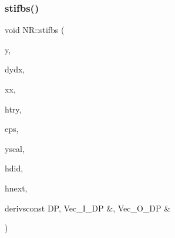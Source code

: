 \subsubsection{\texorpdfstring{stifbs()}{stifbs()}}
{\footnotesize\ttfamily void N\+R\+::stifbs (\begin{DoxyParamCaption}\item[{\mbox{\hyperlink{namespaceNR_ab293e06a6bf799d8a7ed932b6852bcb8}{Vec\+\_\+\+I\+O\+\_\+\+DP}} \&}]{y,  }\item[{\mbox{\hyperlink{namespaceNR_ab293e06a6bf799d8a7ed932b6852bcb8}{Vec\+\_\+\+I\+O\+\_\+\+DP}} \&}]{dydx,  }\item[{\mbox{\hyperlink{namespaceNR_af6ff762dd605ff477b8e52387253a02a}{DP}} \&}]{xx,  }\item[{const \mbox{\hyperlink{namespaceNR_af6ff762dd605ff477b8e52387253a02a}{DP}}}]{htry,  }\item[{const \mbox{\hyperlink{namespaceNR_af6ff762dd605ff477b8e52387253a02a}{DP}}}]{eps,  }\item[{\mbox{\hyperlink{namespaceNR_a9f943da53862537c552e2a770cb170ae}{Vec\+\_\+\+I\+\_\+\+DP}} \&}]{yscal,  }\item[{\mbox{\hyperlink{namespaceNR_af6ff762dd605ff477b8e52387253a02a}{DP}} \&}]{hdid,  }\item[{\mbox{\hyperlink{namespaceNR_af6ff762dd605ff477b8e52387253a02a}{DP}} \&}]{hnext,  }\item[{void }]{derivsconst D\+P, Vec\+\_\+\+I\+\_\+\+D\+P \&, Vec\+\_\+\+O\+\_\+\+D\+P \& }\end{DoxyParamCaption})}

\mbox{\label{namespaceNR_afca47b534f9a096322597481b44a4ea6}} 

